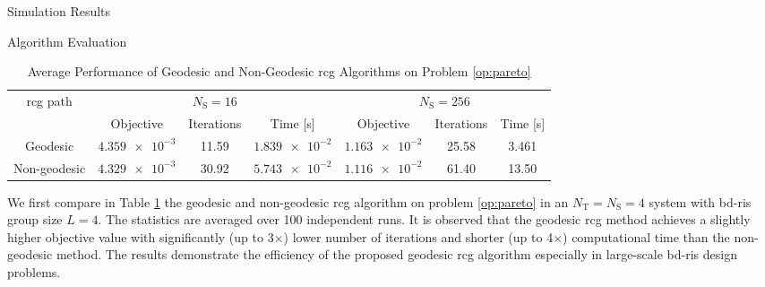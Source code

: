 \documentclass[journal]{IEEEtran}
\begin{document}
\begin{section}{Simulation Results}
	\begin{subsection}{Algorithm Evaluation}
		\begin{table}[!t]
			\caption{Average Performance of Geodesic and Non-Geodesic \gls{rcg} Algorithms on Problem \eqref{op:pareto}}
			\label{tb:complexity_test}
			\centering
			\begin{tabular}{ccccccc}
				\toprule
				\multirow{2}{*}{\gls{rcg} path} & \multicolumn{3}{c}{$N_\mathrm{S}=16$} & \multicolumn{3}{c}{$N_\mathrm{S}=256$}                                                               \\ \cmidrule(lr){2-4} \cmidrule(lr){5-7}
												& Objective                             & Iterations                             & Time [s]         & Objective        & Iterations & Time [s] \\ \midrule
				Geodesic                        & $\num{4.359e-3}$                      & 11.59                                  & $\num{1.839e-2}$ & $\num{1.163e-2}$ & 25.58      & 3.461    \\
				Non-geodesic                    & $\num{4.329e-3}$                      & 30.92                                  & $\num{5.743e-2}$ & $\num{1.116e-2}$ & 61.40      & 13.50    \\ \bottomrule
			\end{tabular}
		\end{table}
		We first compare in Table \ref{tb:complexity_test} the geodesic and non-geodesic \gls{rcg} algorithm on problem \eqref{op:pareto} in an $N_\mathrm{T}=N_\mathrm{S}=4$ system with \gls{bd}-\gls{ris} group size $L=4$.
		The statistics are averaged over \num{100} independent runs.
		It is observed that the geodesic \gls{rcg} method achieves a slightly higher objective value with significantly (up to 3$\times$) lower number of iterations and shorter (up to 4$\times$) computational time than the non-geodesic method.
		The results demonstrate the efficiency of the proposed geodesic \gls{rcg} algorithm especially in large-scale \gls{bd}-\gls{ris} design problems.
	\end{subsection}


\end{section}
\end{document}
